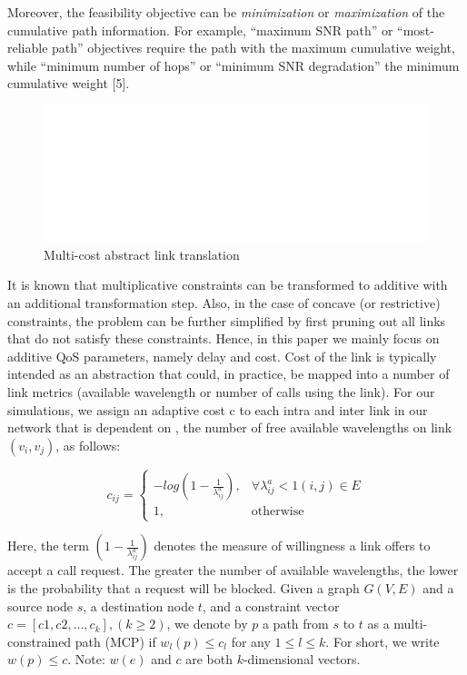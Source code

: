 Moreover, the feasibility objective can be \emph{minimization} or \emph{maximization} of the cumulative path information. For example, ``maximum SNR path'' or ``most-reliable path'' objectives require the path with the maximum cumulative weight, while ``minimum number of hops'' or ``minimum SNR degradation'' the minimum cumulative weight [5].

\begin{figure}[t]
\centering
\includegraphics[clip]{Figures/MConstraintLink.eps}
\caption{Multi-cost abstract link translation}
\label{fig:MConstraintLink}
\end{figure}

It is known that multiplicative constraints can be transformed to additive with an additional transformation step. Also, in the case of concave (or restrictive) constraints, the problem can be further simplified by first pruning out all links that do not satisfy these constraints. Hence, in this paper we mainly focus on additive QoS parameters, namely delay and cost. Cost of the link is typically intended as an abstraction that could, in practice, be mapped into a number of link metrics (\eg available wavelength or number of calls using the link). For our simulations, we assign an adaptive cost c to each intra and inter link in our network that is dependent on  , the number of free available wavelengths on link $(v_i,v_j)$, as follows:

\begin{equation}
c_{ij} =
\begin{cases}
-log(1-\frac{1}{\lambda_{ij}^a}), &\text{$\forall \lambda_{ij}^a < 1 (i,j) \in E$} \\
1, &\text{otherwise}
\end{cases}
\end{equation}

Here, the term $(1-\frac{1}{\lambda_{ij}^a})$ denotes the measure of willingness a link offers to accept a call request. The greater the number of available wavelengths, the lower is the probability that a request will be blocked. Given a graph $G(V, E)$ and a source node $s$, a destination node $t$, and a constraint vector $c = [c1, c2, \dots, c_k],  (k \ge 2)$, we denote by $p$ a path from $s$ to $t$ as a multi-constrained path (MCP) if $w_l(p) \leq c_l$ for any $1 \leq l \leq k$. For short, we write $w(p) \leq c$. Note: $w(e)$ and $c$ are both $k$-dimensional vectors.

